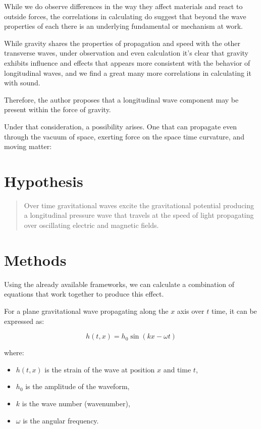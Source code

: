 \documentclass[12pt]{article}
\begin{document}
While we do observe differences in the way they affect materials and react to outside forces, the correlations in calculating do suggest that beyond the wave properties of each there is an underlying fundamental or mechanism at work.

While gravity shares the properties of propagation and speed with the other transverse waves, under observation and even calculation it’s clear that gravity exhibits influence and effects that appears more consistent with the behavior of longitudinal waves, and we find a great many more correlations in calculating it with sound.

Therefore, the author proposes that a longitudinal wave component may be present within the force of gravity.

Under that consideration, a possibility arises. One that can propagate even through the vacuum of space, exerting force on the space time curvature, and moving matter:

\section*{Hypothesis}

\begin{quote}
Over time gravitational waves excite the gravitational potential producing a longitudinal pressure wave that travels at the speed of light propagating over oscillating electric and magnetic fields.
\end{quote}

\section*{Methods}

Using the already available frameworks, we can calculate a combination of equations that work together to produce this effect.

For a plane gravitational wave propagating along the $x$ axis over $t$ time, it can be expressed as:

\[
h(t, x) = h_0 \sin(k x - \omega t)
\]

where:

\begin{itemize}
    \item $h(t,x)$ is the strain of the wave at position $x$ and time $t$,
    \item $h_0$ is the amplitude of the waveform,
    \item $k$ is the wave number (wavenumber),
    \item $\omega$ is the angular frequency.
\end{itemize}
\end{document}
